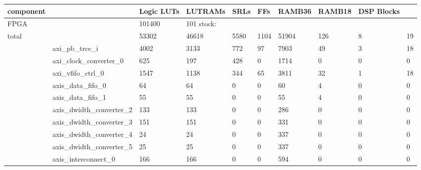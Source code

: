 
\iffalse

\begin{table}
  \begin{center}
\begin{tabular}{llllllllll}
  \toprule
  component & & Logic LUTs & LUTRAMs & SRLs &  FFs  & RAMB36 & RAMB18 & DSP Blocks \\
  \midrule
  FPGA & & 101400 & 101
  \midrule
  stock: \\
total                                      &  &      53302 &      46618 &    5580 & 1104 & 51904 &    126 &      8 &         19 \\
&    axi\_pb\_trce\_i                                    &       4002 &       3133 &     772 &   97 &  7903 &     49 &      3 &         18 \\
&      axi\_clock\_converter\_0                          &        625 &        197 &     428 &    0 &  1714 &      0 &      0 &          0 \\
&      axi\_vfifo\_ctrl\_0                               &       1547 &       1138 &     344 &   65 &  3811 &     32 &      1 &         18 \\
&      axis\_data\_fifo\_0                               &         64 &         64 &       0 &    0 &    60 &      4 &      0 &          0 \\
&      axis\_data\_fifo\_1                               &         55 &         55 &       0 &    0 &    55 &      4 &      0 &          0 \\
&      axis\_dwidth\_converter\_2                        &        133 &        133 &       0 &    0 &   286 &      0 &      0 &          0 \\
&      axis\_dwidth\_converter\_3                        &        151 &        151 &       0 &    0 &   331 &      0 &      0 &          0 \\
&      axis\_dwidth\_converter\_4                        &         24 &         24 &       0 &    0 &   337 &      0 &      0 &          0 \\
&      axis\_dwidth\_converter\_5                        &         25 &         25 &       0 &    0 &   337 &      0 &      0 &          0 \\
&      axis\_interconnect\_0                            &        166 &        166 &       0 &    0 &   594 &      0 &      0 &          0 \\

\end{tabular}
\end{center}
\end{table}
